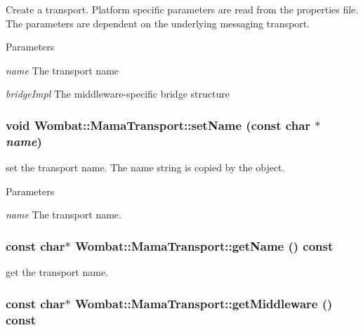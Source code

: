 Create a transport. Platform specific parameters are read from the properties file. The parameters are dependent on the underlying messaging transport.


\begin{DoxyParams}{Parameters}
\item[{\em name}]The transport name \item[{\em bridgeImpl}]The middleware-\/specific bridge structure \end{DoxyParams}
\hypertarget{classWombat_1_1MamaTransport_ad3a1c0fcd02fffd5bef6ab0cbdc3a749}{
\subsubsection[{setName}]{\setlength{\rightskip}{0pt plus 5cm}void Wombat::MamaTransport::setName (const char $\ast$ {\em name})}}
\label{classWombat_1_1MamaTransport_ad3a1c0fcd02fffd5bef6ab0cbdc3a749}


set the transport name. The name string is copied by the object.


\begin{DoxyParams}{Parameters}
\item[{\em name}]The transport name. \end{DoxyParams}
\hypertarget{classWombat_1_1MamaTransport_a21a15a3509ad2a2f6b56f4dc21c8335d}{
\subsubsection[{getName}]{\setlength{\rightskip}{0pt plus 5cm}const char$\ast$ Wombat::MamaTransport::getName () const}}
\label{classWombat_1_1MamaTransport_a21a15a3509ad2a2f6b56f4dc21c8335d}


get the transport name. \hypertarget{classWombat_1_1MamaTransport_ab819fc0d4b50f26d38cabd7abf988584}{
\subsubsection[{getMiddleware}]{\setlength{\rightskip}{0pt plus 5cm}const char$\ast$ Wombat::MamaTransport::getMiddleware () const}}
\label{classWombat_1_1MamaTransport_ab819fc0d4b50f26d38cabd7abf988584}


